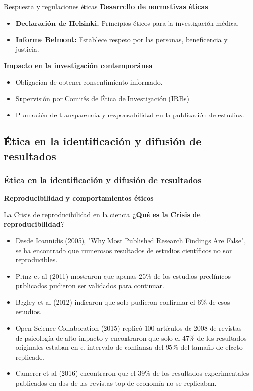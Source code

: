 ﻿\documentclass{beamer}
\begin{document}
\begin{frame}{Respuesta y regulaciones éticas}
    \textbf{Desarrollo de normativas éticas}
    \begin{itemize}
        \item \textbf{Declaración de Helsinki:} Principios éticos para la investigación médica.
        \item \textbf{Informe Belmont:} Establece respeto por las personas, beneficencia y justicia.
    \end{itemize}

    \textbf{Impacto en la investigación contemporánea}
    \begin{itemize}
        \item Obligación de obtener consentimiento informado.
        \item Supervisión por Comités de Ética de Investigación (IRBs).
        \item Promoción de transparencia y responsabilidad en la publicación de estudios.
    \end{itemize}
\end{frame}

\subsection{Ética en la identificación y difusión de resultados}
\begin{frame}
    \frametitle{Ética en la identificación y difusión de resultados}
    \centering
    \textbf{\Large Reproducibilidad y comportamientos éticos}
    \vspace{0.5cm}
\end{frame}

\begin{frame}{La Crisis de reproducibilidad en la ciencia}
\textbf{¿Qué es la Crisis de reproducibilidad?}
\begin{itemize}
    \item Desde Ioannidis (2005), "Why Most Published Research Findings Are False", se ha encontrado que numerosos resultados de estudios científicos no son reproducibles.
    \item Prinz et al (2011) mostraron que apenas 25\% de los estudios preclínicos publicados pudieron ser validados para continuar.
    \item Begley et al (2012) indicaron que solo pudieron confirmar el 6\% de esos estudios.   
    \item Open Science Collaboration (2015) replicó 100 artículos de 2008 de revistas de psicología de alto impacto y encontraron que solo el 47\% de los resultados originales estaban en el intervalo de confianza del 95\% del tamaño de efecto replicado.
    \item Camerer et al (2016) encontraron que el 39\% de los resultados experimentales publicados en dos de las revistas top de economía no se replicaban.
\end{itemize}
\end{frame}
\end{document}
